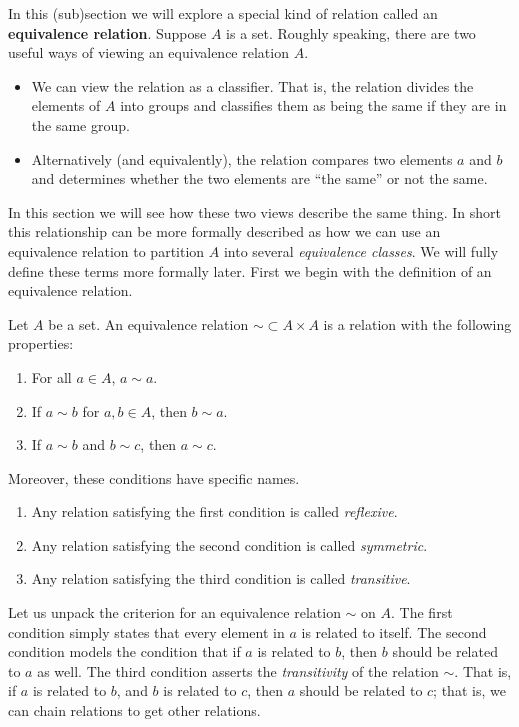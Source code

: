 In this (sub)section we will explore a special kind of relation called an \textbf{equivalence relation}. Suppose $A$ is a set. Roughly speaking, there are two useful ways of viewing an equivalence relation $A$.
\begin{itemize}
	\item We can view the relation as a classifier. That is, the relation divides the elements of $A$ into groups and classifies them as being the same if they are in the same group.
	\item Alternatively (and equivalently), the relation compares two elements $a$ and $b$ and determines whether the two elements are ``the same'' or not the same.
\end{itemize}

In this section we will see how these two views describe the same thing. In short this relationship can be more formally described as how we can use an equivalence relation to partition $A$ into several \textit{equivalence classes}. We will fully define these terms more formally later. First we begin with the definition of an equivalence relation. 

\begin{definition}
Let $A$ be a set. An equivalence relation $\sim \subset A \times A$ is a relation with the following properties:
\begin{enumerate}
	\item For all $a \in A$, $a \sim a$.
	\item If $a \sim b$ for $a, b \in A$, then $b \sim a$.
	\item If $a \sim b$ and $b \sim c$, then $a \sim c$. 
\end{enumerate}

Moreover, these conditions have specific names.
\begin{enumerate}
	\item Any relation satisfying the first condition is called \textit{reflexive}.
	\item Any relation satisfying the second condition is called \textit{symmetric}.
	\item Any relation satisfying the third condition is called \textit{transitive}.
\end{enumerate}
\end{definition}

Let us unpack the criterion for an equivalence relation $\sim$ on $A$. The first condition simply states that every element in $a$ is related to itself. The second condition models the condition that if $a$ is related to $b$, then $b$ should be related to $a$ as well. The third condition asserts the \textit{transitivity} of the relation $\sim$. That is, if $a$ is related to $b$, and $b$ is related to $c$, then $a$ should be related to $c$; that is, we can chain relations to get other relations.

